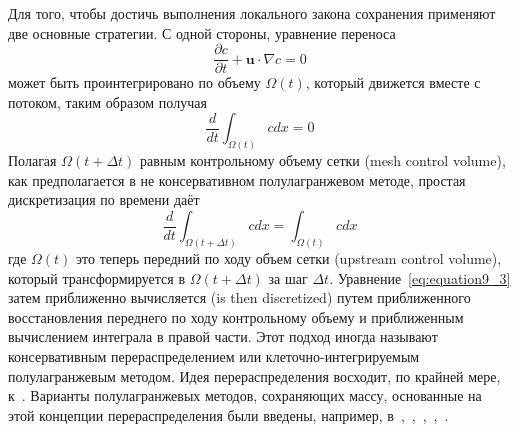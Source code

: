 Для того, чтобы достичь выполнения локального закона сохранения применяют две основные стратегии. С одной стороны, уравнение переноса
%
\begin{equation}
\label{eq:equation9_1}
\frac{\partial c}{\partial t} + \mathbf{u}\cdot\nabla c = 0
\end{equation}
%
может быть проинтегрировано по объему $\Omega(t)$, который движется вместе с потоком, таким образом получая
%
\begin{equation}
\label{eq:equation9_2}
\frac{d}{dt} \int_{\Omega (t)} cdx = 0
\end{equation}
%
Полагая $\Omega (t + \Delta t)$ равным контрольному объему сетки (mesh control volume), как предполагается в не консервативном полулагранжевом методе, простая дискретизация по времени даёт
%
\begin{equation}
\label{eq:equation9_3}
\frac{d}{dt} \int_{\Omega (t+\Delta t)} cdx = \int_{\Omega (t)} cdx
\end{equation}
%
где $\Omega (t)$  это теперь передний по ходу объем сетки (upstream control volume), который трансформируется в $\Omega (t + \Delta t)$ за шаг $\Delta t$. Уравнение~\eqref{eq:equation9_3} затем приближенно вычисляется (is then discretized) путем приближенного восстановления переднего по ходу контрольному объему и приближенным вычислением интеграла в правой части. Этот подход иногда называют консервативным перераспределением или клеточно-интегрируемым полулагранжевым методом. Идея перераспределения восходит, по крайней мере, к~\cite{A25}. Варианты полулагранжевых методов, сохраняющих массу, основанные на этой концепции перераспределения были введены, например, в~\cite{A29},~\cite{A34},~\cite{A35},~\cite{A13},~\cite{A47}.

